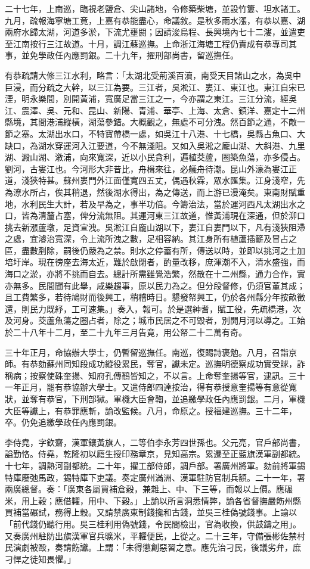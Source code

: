 \begin{pinyinscope}
二十七年，上南巡，臨視老鹽倉、尖山諸地，令修築柴塘，並設竹簍、坦水諸工。九月，疏報海寧塘工竟，上嘉有恭能盡心，命議敘。是秋多雨水漲，有恭以嘉、湖兩府水歸太湖，河道多淤，下流尤壅閼；因請浚烏程、長興境內七十二漊，並遣吏至江南按行三江故道。十月，調江蘇巡撫。上命浙江海塘工程仍責成有恭專司其事，並免學政任內應罰銀。二十九年，擢刑部尚書，留巡撫任。

有恭疏請大修三江水利，略言：「太湖北受荊溪百瀆，南受天目諸山之水，為吳中巨浸，而分疏之大幹，以三江為要。三江者，吳淞江、婁江、東江也。東江自宋已湮，明永樂間，別開黃浦，寬廣足當三江之一，今亦謂之東江。三江分流，經吳江、震澤、吳、元和、昆山、新陽、青浦、華亭、上海、太倉、鎮洋、嘉定十二州縣境，其間港浦縱橫，湖蕩參錯。大概觀之，無處不可分洩。然百節之通，不敵一節之塞。太湖出水口，不特寶帶橋一處，如吳江十八港、十七橋，吳縣占魚口、大缺口，為湖水穿運河入江要道，今不無淺阻。又如入吳淞之龐山湖、大斜港、九里湖、澱山湖、漵浦，向來寬深，近以小民貪利，遍植茭蘆，圈築魚蕩，亦多侵占。劉河，古婁江也。今河形大非昔比，舟楫來往，必艤舟待潮。昆山外濠為婁江正道，淺狹特甚。蘇州婁門外江面僅寬四五丈，偶遇秋霖，眾水匯集。江身淺窄，先為潦水所占，俟其稍退，然後湖水得出，為之傳送，而上游已漫淹矣。東南財賦重地，水利民生大計，若及早為之，事半功倍。今籌治法，當於運河西凡太湖出水之口，皆為清釐占塞，俾分流無阻。其運河東三江故道，惟黃浦現在深通，但於泖口挑去新漲蘆墩，足資宣洩。吳淞江自龐山湖以下，婁江自婁門以下，凡有淺狹阻滯之處，宜濬治寬深，令上流所洩之數，足相容納。其江身所有植蘆插籪及冒占之區，盡數剷除，嗣後仍嚴為之禁。則水之停蓄有所，傳送以時，並即以挑河之土加培圩岸。現在徬座去海太近，難於啟閉者，酌量改移，庶渾潮不入，清水盛強，而海口之淤，亦將不挑而自去。總計所需雖覺浩繁，然散在十二州縣，通力合作，實亦無多。民間聞有此舉，咸樂趨事，原以民力為之。但分段督修，仍須官董其成；且工費繁多，若待鳩財而後興工，稍稽時日。懇發帑興工，仍於各州縣分年按畝徵還，則民力既紓，工可速集。」奏入，報可。於是選紳耆，賦工役，先疏橋港，次及河身。茭蘆魚蕩之圈占者，除之；城市民居之不可毀者，別開月河以導之。工始於二十八年十二月，至二十九年三月告竟，用公帑二十二萬有奇。

三十年正月，命協辦大學士，仍暫留巡撫任。南巡，復賜詩褒勉。八月，召詣京師。有恭劾蘇州同知段成功縱役累民，奪官，讞未定。巡撫明德察成功實受賕，詐稱病；按察使硃奎揚、知府孔傳鶺皆知之，不以言。上命奪奎揚等官，逮訊。三十一年正月，罷有恭協辦大學士。又遣侍郎四達按治，得有恭授意奎揚等有意從寬狀，並奪有恭官，下刑部獄。軍機大臣會鞫，並追繳學政任內應罰銀。二月，軍機大臣等讞上，有恭罪應斬，諭改監候。八月，命原之。授福建巡撫。三十二年，卒。仍免追繳學政任內應罰銀。

李侍堯，字欽齋，漢軍鑲黃旗人，二等伯李永芳四世孫也。父元亮，官戶部尚書，謚勤恪。侍堯，乾隆初以廕生授印務章京，見知高宗。累遷至正藍旗漢軍副都統。十七年，調熱河副都統。二十年，擢工部侍郎，調戶部。署廣州將軍。劾前將軍錫特庫廢弛馬政，錫特庫下吏議。奏定廣州滿洲、漢軍駐防官制兵額。二十一年，署兩廣總督。奏：「廣東各屬買補倉穀，兼雜上、中、下三等，而報以上價。應碾米，用上穀；應借糶，用中、下穀。」上諭以所言洞悉情弊，諭各省督撫嚴飭州縣買補當碾試，務得上穀。又請禁廣東制錢攙和古錢，並吳三桂偽號錢事。上諭以「前代錢仍聽行用。吳三桂利用偽號錢，令民間檢出，官為收換，供鼓鑄之用」。又奏廣州駐防出旗漢軍官兵曠米，平糶便民，上從之。二十三年，守備張彬佐禁村民演劇被毆，奏請飭讞。上謂：「未得懲創惡習之意。應先治刁民，後議劣弁，庶刁悍之徒知畏懼。」


\end{pinyinscope}

